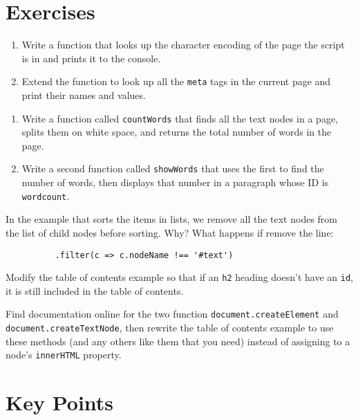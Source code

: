 \section{Exercises}\label{s:pages-exercises}


\begin{enumerate}
\item
  Write a function that looks up the character encoding of the page the script is in
  and prints it to the console.
\item
  Extend the function to look up all the \texttt{meta} tags in the current page
  and print their names and values.
\end{enumerate}


\begin{enumerate}
\item
  Write a function called \texttt{countWords} that finds all the text nodes in a page,
  splits them on white space,
  and returns the total number of words in the page.
\item
  Write a second function called \texttt{showWords} that uses the first to find the number of words,
  then displays that number in a paragraph whose ID is \texttt{wordcount}.
\end{enumerate}


In the example that sorts the items in lists,
we remove all the text nodes from the list of child nodes before sorting.
Why?
What happens if remove the line:

\begin{verbatim}
          .filter(c => c.nodeName !== '#text')
\end{verbatim}


Modify the table of contents example so that if an \texttt{h2} heading doesn't have an \texttt{id},
it is still included in the table of contents.


Find documentation online for the two function
\texttt{document.createElement} and \texttt{document.createTextNode},
then rewrite the table of contents example to use these methods
(and any others like them that you need)
instead of assigning to a node's \texttt{innerHTML} property.

\section*{Key Points}


